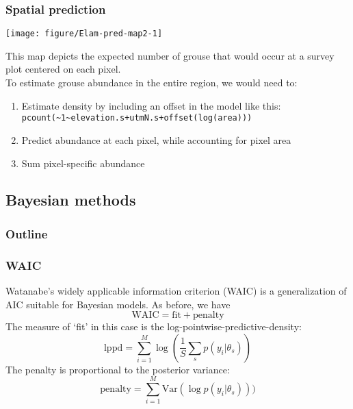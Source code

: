 \documentclass[color=usenames,dvipsnames]{beamer}\usepackage[]{graphicx}\usepackage[]{color}
\newenvironment{knitrout}{}{} %
\begin{document}
\begin{frame}[fragile]
  \frametitle{Spatial prediction}
\begin{knitrout}\scriptsize
{}\color{fgcolor}

{\centering \texttt{[image: figure/Elam-pred-map2-1]} 

}



\end{knitrout}
\footnotesize
This map depicts the expected number of grouse that would occur at a
survey plot centered on each pixel. \\
\pause
\vfill
To estimate grouse abundance in the entire region, we would need to:
\begin{enumerate}
  \footnotesize
  \item Estimate density by including an \alert{offset} in the model
    like this:
    \verb_pcount(~1~elevation.s+utmN.s+offset(log(area)))_
  \item Predict abundance at each pixel, while accounting for pixel area
  \item Sum pixel-specific abundance
\end{enumerate}
\end{frame}





\subsection{Bayesian methods}



\begin{frame}
  \frametitle{Outline}
  \Large
\end{frame}



\begin{frame}
  \frametitle{WAIC}
  Watanabe's widely applicable information criterion (WAIC) is a
  generalization of AIC suitable for Bayesian models. %
  \pause
  As before, we have 
  \[
    \mathrm{WAIC} = \mathrm{fit} + \mathrm{penalty}
  \]
  \pause
  \vfill
  The measure of `fit' in this case is the
  log-pointwise-predictive-density:
  \[
     \mathrm{lppd} = \sum_{i=1}^M \log\left(\frac{1}{S} \sum_s p(y_i|\theta_s)\right)
  \]
  \pause
  \vfill
  The penalty is proportional to the posterior variance:
  \[
     \mathrm{penalty} = \sum_{i=1}^M \mathrm{Var}(\log p(y_i|\theta_s)))
  \]
\end{frame}
\end{document}
